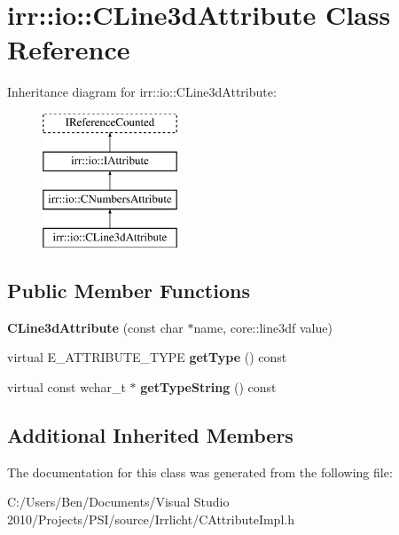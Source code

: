 \hypertarget{classirr_1_1io_1_1_c_line3d_attribute}{\section{irr\-:\-:io\-:\-:C\-Line3d\-Attribute Class Reference}
\label{classirr_1_1io_1_1_c_line3d_attribute}
}
Inheritance diagram for irr\-:\-:io\-:\-:C\-Line3d\-Attribute\-:\begin{figure}[H]
\begin{center}
\leavevmode
\includegraphics[height=4.000000cm]{classirr_1_1io_1_1_c_line3d_attribute}
\end{center}
\end{figure}
\subsection*{Public Member Functions}
\begin{DoxyCompactItemize}
\item 
\hypertarget{classirr_1_1io_1_1_c_line3d_attribute_a6440561000343eff4ab1801cb73f2f55}{{\bfseries C\-Line3d\-Attribute} (const char $\ast$name, core\-::line3df value)}\label{classirr_1_1io_1_1_c_line3d_attribute_a6440561000343eff4ab1801cb73f2f55}

\item 
\hypertarget{classirr_1_1io_1_1_c_line3d_attribute_a6d496434737fbda69114d6fb574fd8ca}{virtual E\-\_\-\-A\-T\-T\-R\-I\-B\-U\-T\-E\-\_\-\-T\-Y\-P\-E {\bfseries get\-Type} () const }\label{classirr_1_1io_1_1_c_line3d_attribute_a6d496434737fbda69114d6fb574fd8ca}

\item 
\hypertarget{classirr_1_1io_1_1_c_line3d_attribute_a5651c95513183b94b94a694cb95031fa}{virtual const wchar\-\_\-t $\ast$ {\bfseries get\-Type\-String} () const }\label{classirr_1_1io_1_1_c_line3d_attribute_a5651c95513183b94b94a694cb95031fa}

\end{DoxyCompactItemize}
\subsection*{Additional Inherited Members}


The documentation for this class was generated from the following file\-:\begin{DoxyCompactItemize}
\item 
C\-:/\-Users/\-Ben/\-Documents/\-Visual Studio 2010/\-Projects/\-P\-S\-I/source/\-Irrlicht/C\-Attribute\-Impl.\-h\end{DoxyCompactItemize}
